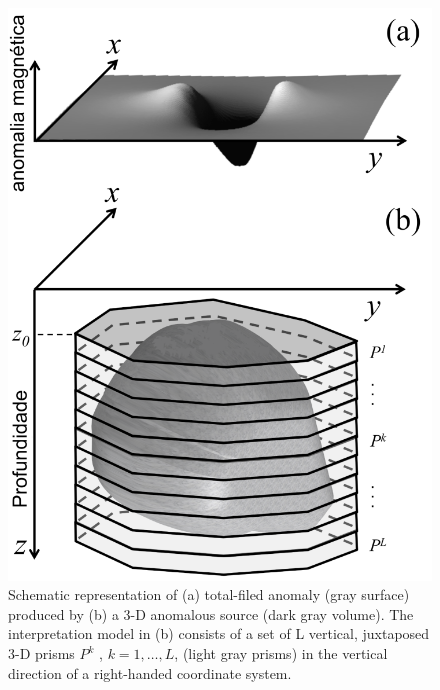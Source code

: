 \begin{figure}
    \centering
    \includegraphics[scale=0.3]{figures/observed_data.png}
    \caption{Schematic representation of (a) total-filed anomaly (gray surface) produced by (b) a 3-D anomalous source (dark gray volume). The interpretation model in (b) consists of a set of L vertical, juxtaposed 3-D prisms $P^k$ , $k = 1,\dots, L$, (light gray prisms) in the vertical direction of a right-handed coordinate system.}
    \label{fig:obs}
\end{figure}


